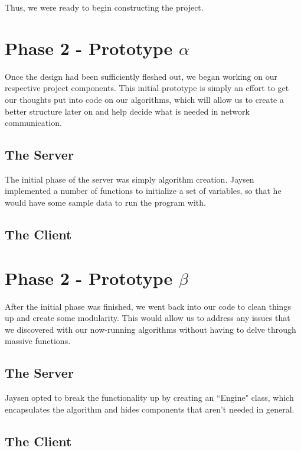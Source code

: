 Thus, we were ready to begin constructing the project.

\section{Phase 2 - Prototype $\alpha$}
Once the design had been sufficiently fleshed out, we began working on our 
respective project components. This initial prototype is simply an effort to get
our thoughts put into code on our algorithms, which will allow us to create a
better structure later on and help decide what is needed in network communication.

\subsection{The Server}
The initial phase of the server was simply algorithm creation. Jaysen implemented
a number of functions to initialize a set of variables, so that he would have some
sample data to run the program with.

\subsection{The Client}

\section{Phase 2 - Prototype $\beta$}
After the initial phase was finished, we went back into our code to clean things up
and create some modularity. This would allow us to address any issues that we
discovered with our now-running algorithms without having to delve through massive
functions.

\subsection{The Server}
Jaysen opted to break the functionality up by creating an ``Engine" class, which
encapsulates the algorithm and hides components that aren't needed in general.

\subsection{The Client}

